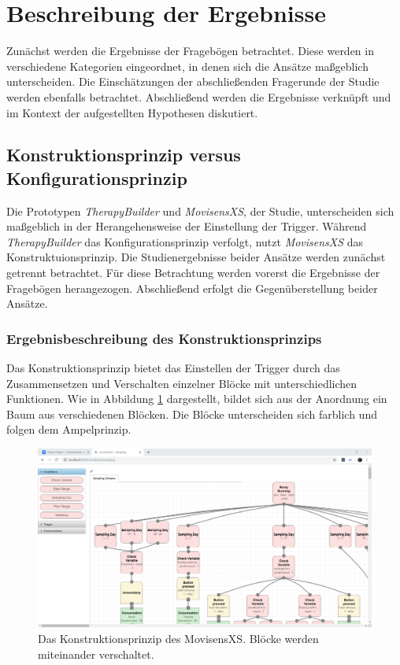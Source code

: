 \section{Beschreibung der Ergebnisse}

Zunächst werden die Ergebnisse der Fragebögen betrachtet. Diese werden in verschiedene Kategorien eingeordnet, in denen sich die Ansätze maßgeblich unterscheiden. Die Einschätzungen der abschließenden Fragerunde der Studie werden ebenfalls betrachtet. Abschließend werden die Ergebnisse verknüpft und im Kontext der aufgestellten Hypothesen diskutiert. 

\subsection{Konstruktionsprinzip versus Konfigurationsprinzip}

Die Prototypen \emph{TherapyBuilder} und \emph{MovisensXS}, der Studie, unterscheiden sich maßgeblich in der Herangehensweise der Einstellung der Trigger. Während \emph{TherapyBuilder} das Konfigurationsprinzip verfolgt, nutzt \emph{MovisensXS} das Konstruktuionsprinzip. Die Studienergebnisse beider Ansätze werden zunächst getrennt betrachtet. Für diese Betrachtung werden vorerst die Ergebnisse der Fragebögen herangezogen. Abschließend erfolgt die Gegenüberstellung beider Ansätze. 

\subsubsection{Ergebnisbeschreibung des Konstruktionsprinzips}

Das Konstruktionsprinzip bietet das Einstellen der Trigger durch das Zusammensetzen und Verschalten einzelner Blöcke mit unterschiedlichen Funktionen. Wie in Abbildung \ref{konstruktion} dargestellt, bildet sich aus der Anordnung ein Baum aus verschiedenen Blöcken. Die Blöcke unterscheiden sich farblich und folgen dem Ampelprinzip.  

\begin{figure}[h]
\centering
\includegraphics[width=1\textwidth]{pictures/konstruktion}
\caption{Das Konstruktionsprinzip des MovisensXS. Blöcke werden miteinander verschaltet.}
\label{konstruktion}
\end{figure}

